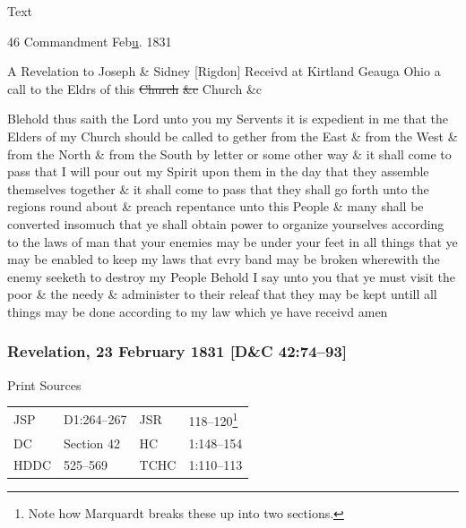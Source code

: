 			\begin{description}
				\item[Text]
			\end{description}
				
				\begin{tightcenter}
				46 Commandment Feb\uline{u}. 1831
				\end{tightcenter}
				
				A Revelation to Joseph \& Sidney [Rigdon] Receivd at Kirtland Geauga Ohio a call to the Eldrs of this \sout{Church} \sout{\&c} Church \&c
				
				Blehold thus saith the Lord unto you my Servents it is expedient in me that the Elders of my Church should be called to gether from the East \& from the West \& from the North \& from the South by letter or some other way \& it shall come to pass that I will pour out my Spirit upon them in the day that they assemble themselves together \& it shall come to pass that they shall go forth unto the regions round about \& preach repentance unto this People \& many shall be converted insomuch that ye shall obtain power to organize yourselves according to the laws of man that your enemies may be under your feet in all things that ye may be enabled to keep my laws that evry band may be broken wherewith the enemy seeketh to destroy my People Behold I say unto you that ye must visit the poor \& the needy \& administer to their releaf that they may be kept untill all things may be done according to my law which ye have receivd amen
				
		\subsubsection{Revelation, 23 February 1831 [D\&C 42:74--93]}
			\label{EMS-1831-JS-23-FEB-1831}
		
			\begin{description}
				\item[Print Sources]
			\end{description}

				\begin{tabular}{p{0.5in}p{1in}p{0.5in}p{1in}}
				JSP	 	& D1:264--267	& JSR 		& 118--120\footnote{Note how Marquardt breaks these up into two sections.} \\
				DC	 	& Section 42 	& HC 		& 1:148--154 \\
				HDDC 	& 525--569		& TCHC 		& 1:110--113 \\
				\end{tabular}
				
